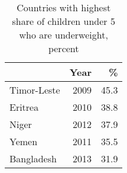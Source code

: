 \begin{table}
\centering
\caption{Countries with highest share of children under 5 who are underweight, percent} 
{\footnotesize
\begin{tabular}{p{1.6cm}rr}
  \toprule
 & Year & \% \\ 
  \midrule
Timor-Leste & 2009 & 45.3 \\ 
  Eritrea & 2010 & 38.8 \\ 
  Niger & 2012 & 37.9 \\ 
  Yemen & 2011 & 35.5 \\ 
  Bangladesh & 2013 & 31.9 \\ 
   \bottomrule
\end{tabular}
}
\end{table}
